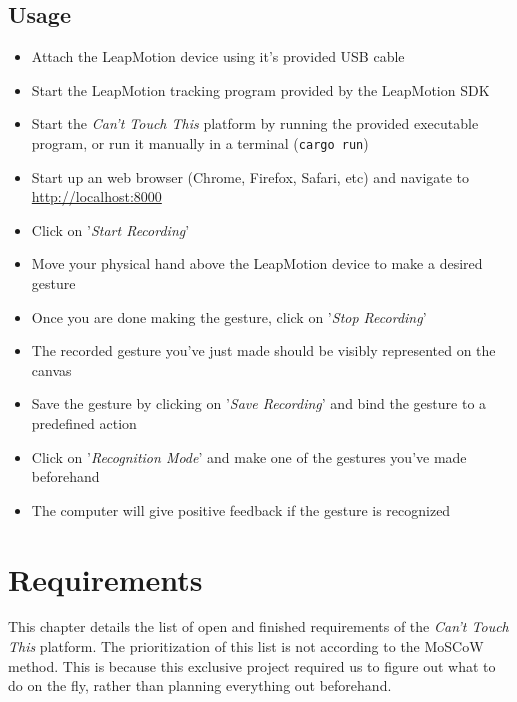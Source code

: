 \documentclass[a4paper]{article}
\providecommand{\tightlist}{%
\setlength{\itemsep}{0pt}\setlength{\parskip}{0pt}}
\begin{document}
  \subsection{Usage}
  \begin{itemize}
    \tightlist{}
    \item Attach the LeapMotion device using it's provided USB cable
    \item Start the LeapMotion tracking program provided by the LeapMotion SDK
    \item Start the \textit{Can't Touch This} platform by running the provided
      executable program, or run it manually in a terminal (\verb_cargo run_)
    \item Start up an web browser (Chrome, Firefox, Safari, etc) and navigate to
      \\ \url{http://localhost:8000}
    \item Click on '\textit{Start Recording}'
    \item Move your physical hand above the LeapMotion device to make a desired
      gesture
    \item Once you are done making the gesture, click on
      '\textit{Stop Recording}'
    \item The recorded gesture you've just made should be visibly represented on
      the canvas
    \item Save the gesture by clicking on '\textit{Save Recording}' and bind the
      gesture to a predefined action
    \item Click on '\textit{Recognition Mode}' and make one of the gestures
      you've made beforehand
    \item The computer will give positive feedback if the gesture is recognized
  \end{itemize}
  \clearpage

  \section{Requirements}
  This chapter details the list of open and finished requirements of the
  \textit{Can't Touch This} platform. The prioritization of this list is not
  according to the MoSCoW method. This is because this exclusive project
  required us to figure out what to do on the fly, rather than planning
  everything out beforehand.
\end{document}
